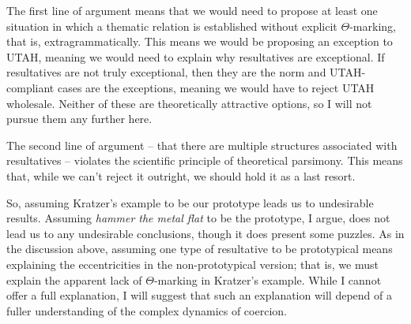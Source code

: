 \documentclass[MilwayThesis]{subfiles}
\begin{document}
The first line of argument means that we would need to propose at least one situation in which a thematic relation is established without explicit $\Theta$-marking, that is, extragrammatically.
This means we would be proposing an exception to UTAH, meaning we would need to explain why resultatives are exceptional.
If resultatives are not truly exceptional, then they are the norm and UTAH-compliant cases are the exceptions, meaning we would have to reject UTAH wholesale.
Neither of these are theoretically attractive options, so I will not pursue them any further here.

The second line of argument -- that there are multiple structures associated with resultatives -- violates the scientific principle of theoretical parsimony.
This means that, while we can't reject it outright, we should hold it as a last resort.

So, assuming Kratzer's example to be our prototype leads us to undesirable results.
Assuming \textit{hammer the metal flat} to be the prototype, I argue, does not lead us to any undesirable conclusions, though it does present some puzzles.
As in the discussion above, assuming one type of resultative to be prototypical means explaining the eccentricities in the non-prototypical version;
that is, we must explain the apparent lack of $\Theta$-marking in Kratzer's example.
While I cannot offer a full explanation, I will suggest that such an explanation will depend of a fuller understanding of the complex dynamics of coercion.
\end{document}
